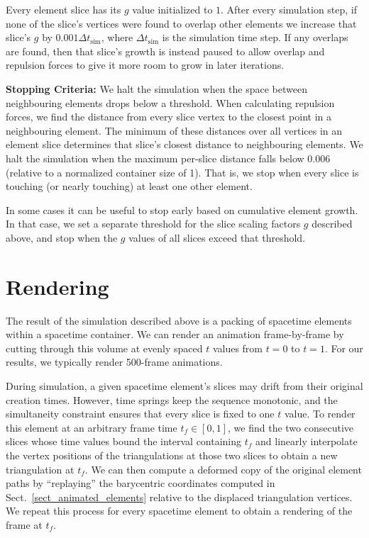 Every element slice has its $g$ value initialized to $1$.  After every
simulation step, if none of the slice's vertices were found to 
overlap other elements we increase that slice's $g$ by 
$0.001 \Delta t_\mathrm{sim}$, where $\Delta t_\mathrm{sim}$ is the 
simulation time step.  If any overlaps are found, then that slice's
growth is instead paused to allow overlap and repulsion forces to give it more
room to grow in later iterations.  

\textbf{Stopping Criteria:} We halt the simulation when the space between
neighbouring elements drops below a threshold.  When calculating 
repulsion forces, we find the distance from every slice vertex
to the closest point in a neighbouring element.  The minimum of these
distances over all vertices in an element slice determines that slice's
closest distance to neighbouring elements.  We halt the simulation
when the maximum per-slice distance falls below 0.006 (relative to a normalized
container size of 1).  That is, we stop when every slice is touching
(or nearly touching) at least one other element.

In some cases it can be useful to stop early based on cumulative element
growth.  In that case, we set a separate threshold for the slice scaling
factors $g$ described above, and stop when the $g$ values of all
slices exceed that threshold.


\section{Rendering}
\label{animationpak_rendering}

The result of the simulation described above is a packing of spacetime 
elements within a spacetime container.  We can render an
animation frame-by-frame by cutting through this volume at 
evenly spaced $t$ values from $t=0$ to $t=1$.  For our results, we
typically render 500-frame animations.

During simulation, a given spacetime element's slices may drift from their
original creation times.  However, time springs keep the sequence
monotonic, and the simultaneity constraint ensures that every slice
is fixed to one $t$ value.  To render this element at an arbitrary
frame time $t_f\in[0,1]$, we find the two consecutive slices whose
time values
bound the interval containing $t_f$ and linearly interpolate the vertex
positions of the triangulations at those two slices to obtain a new
triangulation at $t_f$.  We can then compute a deformed copy of the
original element paths by ``replaying'' the barycentric coordinates 
computed in Sect.~\ref{sect_animated_elements} relative to the displaced
triangulation vertices.  We repeat this process for every spacetime element
to obtain a rendering of the frame at $t_f$.

